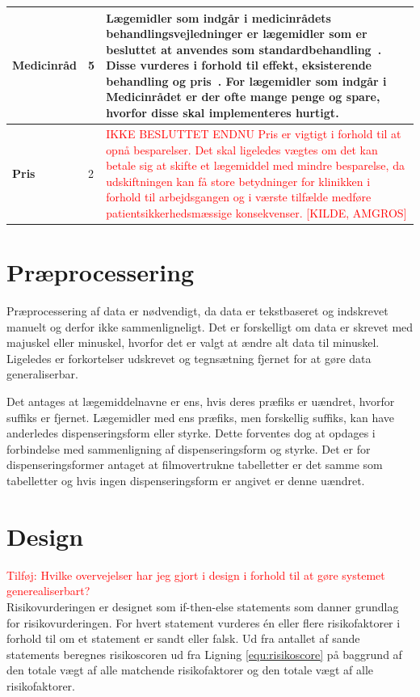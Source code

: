 \begin{longtable}{p{3.5cm}| p{1.0cm} | p{9.2cm}}
 \\ \hline 
\textbf{Medicinråd} & 5 & Lægemidler som indgår i medicinrådets behandlingsvejledninger er lægemidler som er besluttet at anvendes som standardbehandling~\citep{Medicinradet2018}. Disse vurderes i forhold til effekt, eksisterende behandling og pris~\citep{Medicinradet2018}. For lægemidler som indgår i Medicinrådet er der ofte mange penge og spare, hvorfor disse skal implementeres hurtigt. \\ \hline 
\textbf{Pris} &  2 & \textcolor{red}{ IKKE BESLUTTET ENDNU Pris er vigtigt i forhold til at opnå besparelser. Det skal ligeledes vægtes om det kan betale sig at skifte et lægemiddel med mindre besparelse, da udskiftningen kan få store betydninger for klinikken i forhold til arbejdsgangen og i værste tilfælde medføre patientsikkerhedsmæssige konsekvenser. [KILDE, AMGROS]} \\ \hline
    \end{longtable}

\section{Præprocessering}
Præprocessering af data er nødvendigt, da data er tekstbaseret og indskrevet manuelt og derfor ikke sammenligneligt. Det er forskelligt om data er skrevet med majuskel eller minuskel, hvorfor det er valgt at ændre alt data til minuskel. Ligeledes er forkortelser udskrevet og tegnsætning fjernet for at gøre data generaliserbar. 

Det antages at lægemiddelnavne er ens, hvis deres præfiks er uændret, hvorfor suffiks er fjernet. Lægemidler med ens præfiks, men forskellig suffiks, kan have anderledes dispenseringsform eller styrke. Dette forventes dog at opdages i forbindelse med sammenligning af dispenseringsform og styrke. Det er for dispenseringsformer antaget at filmovertrukne tabelletter er det samme som tabelletter og hvis ingen dispenseringsform er angivet er denne uændret.

\section{Design}
\textcolor{red}{Tilføj: Hvilke overvejelser har jeg gjort i design i forhold til at gøre systemet generealiserbart?} \\
Risikovurderingen er designet som if-then-else statements som danner grundlag for risikovurderingen. For hvert statement vurderes én eller flere risikofaktorer i forhold til om et statement er sandt eller falsk. Ud fra antallet af sande statements beregnes risikoscoren ud fra Ligning \ref{equ:risikoscore} på baggrund af den totale vægt af alle matchende risikofaktorer og den totale vægt af alle risikofaktorer.

